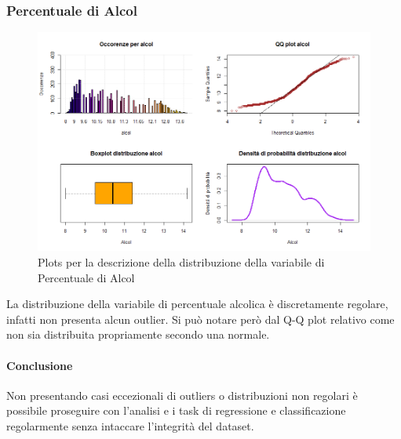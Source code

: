 \documentclass[12pt]{article}
\begin{document}
\subsubsection{Percentuale di Alcol}
\begin{figure}[!htb]
    \centering
    \includegraphics[width=1\textwidth]{immagini/alcol.png}
    \caption{Plots per la descrizione della distribuzione della variabile di Percentuale di Alcol}
\end{figure}
\FloatBarrier
La distribuzione della variabile di percentuale alcolica è discretamente regolare, infatti non presenta alcun outlier. Si può notare però dal Q-Q plot relativo come non sia distribuita propriamente secondo una normale.
\paragraph{Conclusione} Non presentando casi eccezionali di outliers o distribuzioni non regolari è possibile proseguire con l'analisi e i task di regressione e classificazione regolarmente senza intaccare l'integrità del dataset.
\newpage
\end{document}
